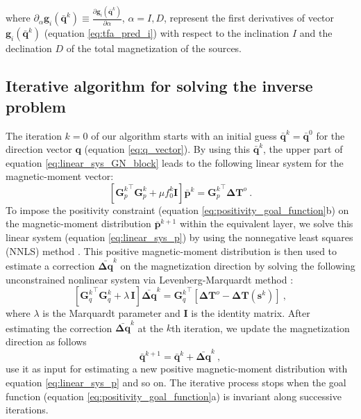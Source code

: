 where 
$\partial_{\alpha} \mathbf{g}_{i}(\bar{\mathbf{q}}^{k}) \equiv 
\frac{\partial \mathbf{g}_{i}(\bar{\mathbf{q}}^{k})}{\partial \alpha}$, $\alpha= I, D$, 
represent the first derivatives of vector 
$\mathbf{g}_{i}(\bar{\mathbf{q}}^{k})$ (equation \ref{eq:tfa_pred_i}) with respect to the 
inclination $I$ and the declination $D$ of the total magnetization of the sources.

\subsection{Iterative algorithm for solving the inverse problem}

The iteration $k = 0$ of our algorithm starts with an initial guess 
$\bar{\mathbf{q}}^{k} = \bar{\mathbf{q}}^{0}$ for the direction vector $\mathbf{q}$ 
(equation \ref{eq:q_vector}).
By using this $\bar{\mathbf{q}}^{k}$, the upper part of equation 
\ref{eq:linear_sys_GN_block} leads to the following linear system for the magnetic-moment 
vector:
\begin{equation}
\left[ {\mathbf{G}_{p}^{k}}^{\top} \mathbf{G}_{p}^{k} + 
\mu f_{0}^{k} \mathbf{I} \right] \bar{\mathbf{p}}^{k} = {\mathbf{G}_{p}^{k}}^{\top} \mathbf{\Delta T}^{o} \: .
\label{eq:linear_sys_p}
\end{equation}
To impose the positivity constraint (equation \ref{eq:positivity_goal_function}b) on the 
magnetic-moment distribution $\bar{\mathbf{p}}^{k+1}$ within the equivalent layer, 
we solve this linear system (equation \ref{eq:linear_sys_p}) by using the nonnegative least 
squares (NNLS) method \citep{lawson_hanson_1974}.
This positive magnetic-moment distribution is then used to estimate a correction 
$\bar{\mathbf{\Delta q}}^{k}$ on the magnetization direction by solving the following 
unconstrained nonlinear system via Levenberg-Marquardt method \citep{aster2005}:
\begin{equation}
\left[ {\mathbf{G}_{q}^{k}}^{\top} \mathbf{G}_{q}^{k} + \lambda \, \mathbf{I} \right] 
\bar{\mathbf{\Delta q}}^{k} = {\mathbf{G}_{q}^{k}}^{\top} 
\left[ \mathbf{\Delta T}^{o} - \mathbf{\Delta T} (\mathbf{s}^{k}) \right] \: ,
\label{eq:linear_sys_q}
\end{equation}
where $\lambda$ is the Marquardt parameter and $\mathbf{I}$ is the identity matrix. 
After estimating the correction $\bar{\mathbf{\Delta q}}^{k}$ 
at the $k$th iteration, we update the magnetization direction as follows
\begin{equation}
\bar{\mathbf{q}}^{k+1} = \bar{\mathbf{q}}^{k} + \bar{\mathbf{\Delta q}}^{k} \: ,
\label{eq:q_next}
\end{equation}
use it as input for estimating a new positive magnetic-moment distribution 
with equation \ref{eq:linear_sys_p} and so on.
The iterative process stops when the goal function (equation \ref{eq:positivity_goal_function}a) 
is invariant along successive iterations. 

